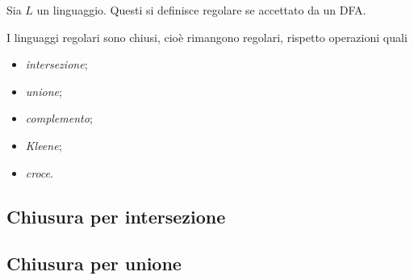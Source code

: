 \documentclass{subfiles}
\begin{document}
\begin{Definition*}
    Sia \(L\) un linguaggio. Questi si definisce regolare se accettato da un DFA.
\end{Definition*}

\noindent I linguaggi regolari sono chiusi, cioè rimangono regolari, rispetto operazioni quali
\begin{itemize}
    \item \emph{intersezione};
    \item \emph{unione};
    \item \emph{complemento};
    \item \emph{Kleene};
    \item \emph{croce}.
\end{itemize}

\subsection{Chiusura per intersezione}


\subsection{Chiusura per unione}

\end{document}
